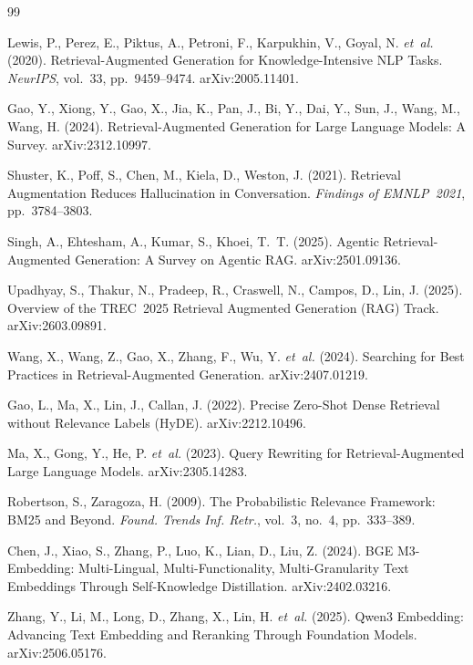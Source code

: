 \documentclass[11pt,a4paper]{article}
\begin{document}
\begin{thebibliography}{99}
\small

Lewis, P., Perez, E., Piktus, A., Petroni, F., Karpukhin, V., Goyal, N. \textit{et~al.} (2020).
Retrieval-Augmented Generation for Knowledge-Intensive NLP Tasks.
\textit{NeurIPS}, vol.~33, pp.~9459--9474. arXiv:2005.11401.

Gao, Y., Xiong, Y., Gao, X., Jia, K., Pan, J., Bi, Y., Dai, Y., Sun, J., Wang, M., Wang, H. (2024).
Retrieval-Augmented Generation for Large Language Models: A Survey.
arXiv:2312.10997.

Shuster, K., Poff, S., Chen, M., Kiela, D., Weston, J. (2021).
Retrieval Augmentation Reduces Hallucination in Conversation.
\textit{Findings of EMNLP~2021}, pp.~3784--3803.

Singh, A., Ehtesham, A., Kumar, S., Khoei, T.~T. (2025).
Agentic Retrieval-Augmented Generation: A Survey on Agentic RAG.
arXiv:2501.09136.

Upadhyay, S., Thakur, N., Pradeep, R., Craswell, N., Campos, D., Lin, J. (2025).
Overview of the TREC~2025 Retrieval Augmented Generation (RAG) Track.
arXiv:2603.09891.

Wang, X., Wang, Z., Gao, X., Zhang, F., Wu, Y. \textit{et~al.} (2024).
Searching for Best Practices in Retrieval-Augmented Generation.
arXiv:2407.01219.

Gao, L., Ma, X., Lin, J., Callan, J. (2022).
Precise Zero-Shot Dense Retrieval without Relevance Labels (HyDE).
arXiv:2212.10496.

Ma, X., Gong, Y., He, P. \textit{et~al.} (2023).
Query Rewriting for Retrieval-Augmented Large Language Models.
arXiv:2305.14283.

Robertson, S., Zaragoza, H. (2009).
The Probabilistic Relevance Framework: BM25 and Beyond.
\textit{Found. Trends Inf. Retr.}, vol.~3, no.~4, pp.~333--389.

Chen, J., Xiao, S., Zhang, P., Luo, K., Lian, D., Liu, Z. (2024).
BGE M3-Embedding: Multi-Lingual, Multi-Functionality, Multi-Granularity Text Embeddings Through Self-Knowledge Distillation.
arXiv:2402.03216.

Zhang, Y., Li, M., Long, D., Zhang, X., Lin, H. \textit{et~al.} (2025).
Qwen3 Embedding: Advancing Text Embedding and Reranking Through Foundation Models.
arXiv:2506.05176.


\end{thebibliography}
\end{document}
